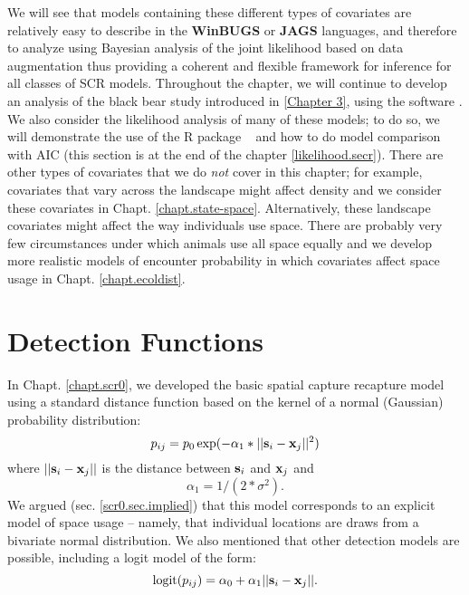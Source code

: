 We will see that models containing these different types of
covariates are relatively easy to describe in the {\bf WinBUGS} or
{\bf JAGS} languages, and
therefore to analyze using Bayesian analysis of the joint likelihood
based on data augmentation thus providing a coherent and flexible
framework for inference for all classes of SCR models.  Throughout the
chapter, we will continue to develop an analysis of the black bear
study introduced in \ref{Chapter 3}, using the software
\jags.  We also
consider the likelihood analysis of many of these models; to do so, we
will demonstrate the use of the R package \secr~ and how to do model
comparison with AIC (this section is at the end of the chapter \ref{likelihood.secr}).
There are other types of covariates that we do {\it not} cover in this
chapter; for example, covariates that vary across the
landscape might affect density and we consider these covariates in
Chapt. \ref{chapt.state-space}.
Alternatively, these landscape covariates might affect the way individuals use
space. There are probably very few circumstances under which animals use all 
space equally and we develop more realistic models of encounter
probability in which covariates affect space usage in Chapt. \ref{chapt.ecoldist}.


\section{Detection Functions}

In Chapt. \ref{chapt.scr0}, we developed the basic spatial capture
recapture model using a standard distance function based on the kernel
of a normal (Gaussian) probability distribution:
\[
p_{ij} = p_{0} \exp(-\alpha_{1} *||{\bf s}_{i}-{\bf x}_{j}||^2)
\]
where $||{\bf s}_{i}-{\bf x}_{j}||$ is the distance between ${\bf
  s}_{i}$ and ${\bf x}_{j}$ and
\[
\alpha_{1} = 1/(2*\sigma^2).
\]
We argued (sec. \ref{scr0.sec.implied}) that this model corresponds to
an explicit model of space usage -- namely, that individual locations
are draws from a bivariate normal distribution. We also mentioned that
other detection models are possible, including a logit model of the
form:
\begin{equation}
	\mbox{logit}(p_{ij}) = \alpha_{0} + \alpha_1 ||{\bf s}_{i}-{\bf x}_{j} ||.
\label{covariates.eq.logit}
\end{equation}

